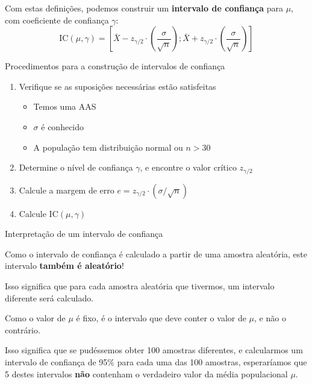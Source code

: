 \documentclass[14pt,aspectratio=1610]{beamer}
\begin{document}
\begin{frame}{}
    \begin{block}{}
    \justifying
Com estas definições, podemos construir um \textbf{intervalo de confiança} para $\mu$, com coeficiente de confiança $\gamma$:
$$
\text{IC}(\mu, \gamma) = \left[ \bar{X} - z_{\gamma/2} \cdot
  \left(\frac{\sigma}{\sqrt{n}}\right) ; \bar{X} + z_{\gamma/2} \cdot
  \left(\frac{\sigma}{\sqrt{n}}\right)  \right]
$$   
    \end{block}
\end{frame}

\begin{frame}{Procedimentos para a construção de intervalos de confiança}
    \begin{block}{}
    \justifying
\begin{enumerate}
    \item Verifique se as suposições necessárias estão satisfeitas
    \begin{itemize}
        \item Temos uma AAS
        \item $\sigma$ é conhecido
        \item A população tem distribuição normal ou $n>30$
    \end{itemize}
   
    \item Determine o nível de confiança $\gamma$, e encontre o valor crítico $z_{\gamma/2}$
    \item Calcule a margem de erro $e = z_{\gamma/2} \cdot (\sigma/\sqrt{n})$
    \item Calcule $\text{IC}(\mu, \gamma)$
\end{enumerate}   
    \end{block}
\end{frame}

\begin{frame}{Interpretação de um intervalo de confiança}
    \begin{block}{}
    \justifying
Como o intervalo de confiança é calculado a partir de uma amostra aleatória, este intervalo \textbf{também é aleatório}!

Isso significa que para cada amostra aleatória que tivermos, um intervalo diferente será calculado.

Como o valor de $\mu$ é fixo, é o intervalo que deve conter o valor de $\mu$, e não o contrário.

Isso significa que se pudéssemos obter 100 amostras diferentes, e calcularmos um intervalo de confiança de 95\% para cada uma das 100 amostras, esperaríamos que 5 destes intervalos \textbf{não} contenham o verdadeiro valor da média populacional $\mu$.   
    \end{block}
\end{frame}
\end{document}
